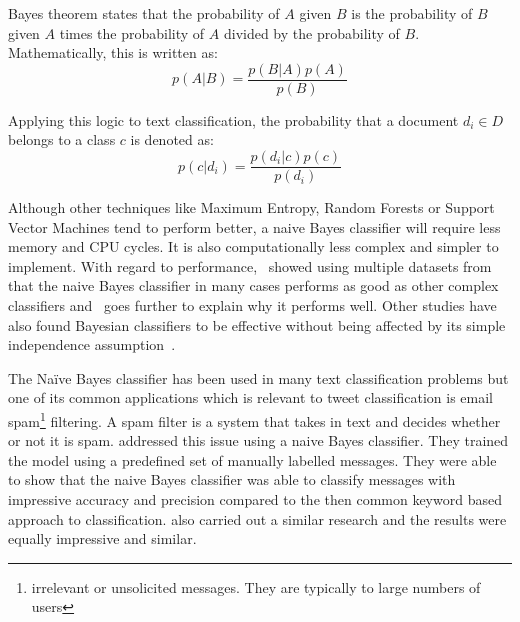 Bayes theorem states that the probability of $A$ given $B$ is the probability of $B$ given $A$ times
the probability of $A$ divided by the probability of $B$. Mathematically, this is written as:
\begin{equation}
  p(A|B) = \frac{p(B|A)p(A)}{p(B)}
\end{equation}

Applying this logic to text classification, the probability that a document $d_i \in D$ belongs to a
class $c$ is denoted as:
\begin{equation}
  p(c|d_i) = \frac{p(d_i|c)p(c)}{p(d_i)}
\end{equation}

Although other techniques like Maximum Entropy, Random Forests or Support Vector Machines tend to
perform better, a naive Bayes classifier will require less memory and CPU cycles. It is also
computationally less complex and simpler to implement. With regard to
performance,~\cite{huangLuLing2003} showed using multiple datasets from~\cite{blakeMerz1998} that
the naive Bayes classifier in many cases performs as good as other complex classifiers
and~\cite{zhang2004} goes further to explain why it performs well. Other studies have also found
Bayesian classifiers to be effective without being affected by its simple independence
assumption~\cite{langley1992analysis,manning2008}.

The Na\"{i}ve Bayes classifier has been used in many text classification problems but one of its
common applications which is relevant to tweet classification is email spam\footnote{irrelevant or
unsolicited messages. They are typically to large numbers of users} filtering. A spam
filter is a system that takes in text and decides whether or not it is
spam. \cite{androutsopoulos2000learning} addressed this issue using a naive Bayes classifier. They
trained the model using a predefined set of manually labelled messages. They were able to show that
the naive Bayes classifier was able to classify messages with impressive accuracy and precision
compared to the then common keyword based approach to classification. \cite{deshpande2007evaluation}
also carried out a similar research and the results were equally impressive and similar.

